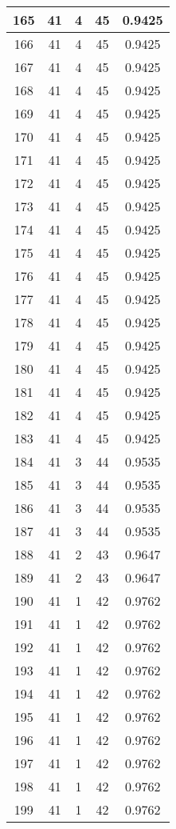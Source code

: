 \documentclass[letterpaper, 12pt]{article}
\begin{document}
\begin{longtable}{|c|c|c|c|c|}
\hline
165 & 41 & 4 & 45 & 0.9425 \\
\hline
166 & 41 & 4 & 45 & 0.9425 \\
\hline
167 & 41 & 4 & 45 & 0.9425 \\
\hline
168 & 41 & 4 & 45 & 0.9425 \\
\hline
169 & 41 & 4 & 45 & 0.9425 \\
\hline
170 & 41 & 4 & 45 & 0.9425 \\
\hline
171 & 41 & 4 & 45 & 0.9425 \\
\hline
172 & 41 & 4 & 45 & 0.9425 \\
\hline
173 & 41 & 4 & 45 & 0.9425 \\
\hline
174 & 41 & 4 & 45 & 0.9425 \\
\hline
175 & 41 & 4 & 45 & 0.9425 \\
\hline
176 & 41 & 4 & 45 & 0.9425 \\
\hline
177 & 41 & 4 & 45 & 0.9425 \\
\hline
178 & 41 & 4 & 45 & 0.9425 \\
\hline
179 & 41 & 4 & 45 & 0.9425 \\
\hline
180 & 41 & 4 & 45 & 0.9425 \\
\hline
181 & 41 & 4 & 45 & 0.9425 \\
\hline
182 & 41 & 4 & 45 & 0.9425 \\
\hline
183 & 41 & 4 & 45 & 0.9425 \\
\hline
184 & 41 & 3 & 44 & 0.9535 \\
\hline
185 & 41 & 3 & 44 & 0.9535 \\
\hline
186 & 41 & 3 & 44 & 0.9535 \\
\hline
187 & 41 & 3 & 44 & 0.9535 \\
\hline
188 & 41 & 2 & 43 & 0.9647 \\
\hline
189 & 41 & 2 & 43 & 0.9647 \\
\hline
190 & 41 & 1 & 42 & 0.9762 \\
\hline
191 & 41 & 1 & 42 & 0.9762 \\
\hline
192 & 41 & 1 & 42 & 0.9762 \\
\hline
193 & 41 & 1 & 42 & 0.9762 \\
\hline
194 & 41 & 1 & 42 & 0.9762 \\
\hline
195 & 41 & 1 & 42 & 0.9762 \\
\hline
196 & 41 & 1 & 42 & 0.9762 \\
\hline
197 & 41 & 1 & 42 & 0.9762 \\
\hline
198 & 41 & 1 & 42 & 0.9762 \\
\hline
199 & 41 & 1 & 42 & 0.9762 \\
\hline
\end{longtable}
\end{document}
